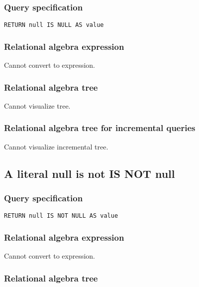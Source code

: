 \subsubsection*{Query specification}

\begin{lstlisting}
RETURN null IS NULL AS value
\end{lstlisting}

\subsubsection*{Relational algebra expression}

Cannot convert to expression.

\subsubsection*{Relational algebra tree}

Cannot visualize tree.

\subsubsection*{Relational algebra tree for incremental queries}

Cannot visualize incremental tree.

\subsection{A literal null is not IS NOT null}

\subsubsection*{Query specification}

\begin{lstlisting}
RETURN null IS NOT NULL AS value
\end{lstlisting}

\subsubsection*{Relational algebra expression}

Cannot convert to expression.

\subsubsection*{Relational algebra tree}


